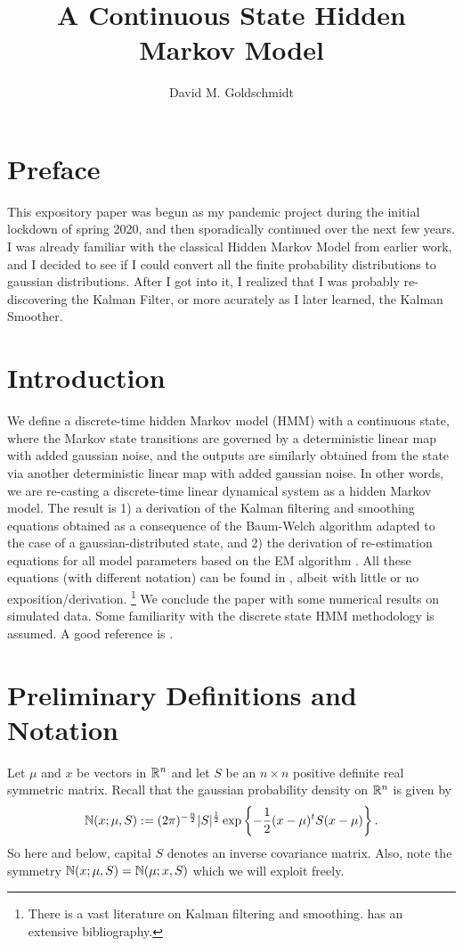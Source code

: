 \documentclass[12pt,leqno]{article}
\title{A Continuous State Hidden Markov Model}
\author{David M. Goldschmidt}
\begin{document}
\newcommand{\p}{\ensuremath{u}}
\newcommand{\VV}{V}
\maketitle

\section{Preface}
This expository paper  was begun as my pandemic project during the initial lockdown of spring 2020, and then sporadically
continued over the next few years.  I was already familiar with the classical Hidden Markov Model from earlier
work, and I decided to see if I could  convert all the finite probability distributions to gaussian distributions.
After I got into it, I realized that I was probably re-discovering the Kalman Filter, or more acurately as I later learned,
the Kalman Smoother.  

\section{Introduction}
We define a discrete-time hidden Markov model (HMM) with a continuous state, where the  Markov state transitions
are governed by a deterministic linear map with added gaussian noise, and the outputs are similarly obtained from the
state via another deterministic linear map with added gaussian noise.  In other words, we are re-casting a discrete-time
linear dynamical system as a hidden Markov model.  The result is 1) a derivation of the Kalman filtering and smoothing
equations \cite{Aravkin} obtained as a consequence of the Baum-Welch algorithm \cite{Bilmes} adapted to the case of a
gaussian-distributed state, and 2) the derivation of re-estimation equations for all model parameters based on the EM algorithm
\cite{Dempster}.  All these equations (with different notation) can be found in \cite{Hinton}, albeit with little or no
exposition/derivation.  \footnote{There is a vast literature on Kalman filtering and smoothing.  \cite{Aravkin} has an extensive bibliography.}
We conclude the paper with some numerical results on simulated data.
Some familiarity with the discrete state HMM methodology is assumed.  A good reference is \cite{Bilmes}. 

\section{Preliminary Definitions and Notation}
Let $\mu$ and $x$ be vectors in ${\mathbb R}^n$ and let $S$ be an $n\times{n}$ positive
definite real symmetric matrix.  Recall that the gaussian probability density
on ${\mathbb R}^n$ is given by 
$$
{\mathbb N}(x;\mu,S) := (2\pi)^{-\frac{n}{2}}|S|^{\frac{1}{2}}\exp\left\{-\frac{1}{2}
(x - \mu)^tS(x-\mu)\right\}.
$$
So here and below, capital $S$ denotes an inverse covariance matrix. Also, note the symmetry ${\mathbb N}(x;\mu,S) = {\mathbb N}(\mu;x,S)$
which we will exploit freely.
\end{document}

